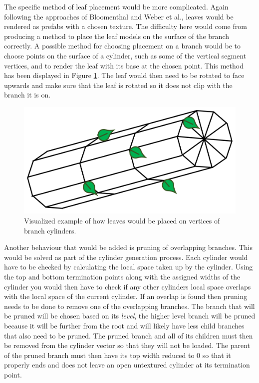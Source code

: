 \documentclass[final]{cmpreport}
\begin{document}
The specific method of leaf placement would be more complicated. Again following the approaches of 
Bloomenthal and Weber et al., leaves would be rendered as prefabs with a chosen texture. The difficulty 
here would come from producing a method to place the leaf models on the surface of the branch correctly.
A possible method for choosing placement on a branch would be to choose points on the surface of a 
cylinder, such as some of the vertical segment vertices, and to render the leaf with its base at the 
chosen point. This method has been displayed in Figure \ref{fig:leaf-placement}. The leaf would then 
need to be rotated to face upwards and make sure that the leaf is rotated so it does not clip with the 
branch it is on.

\begin{figure}[ht]
    \includegraphics[scale=0.4]{leaf-placement.PNG} 
    \centering
    \captionsetup{justification=centering}
    \caption{Visualized example of how leaves would be placed on vertices of branch cylinders.}
    \label{fig:leaf-placement}
\end{figure}

Another behaviour that would be added is pruning of overlapping branches. This would be solved 
as part of the cylinder generation process. Each cylinder would have to be checked by calculating 
the local space taken up by the cylinder. Using the top and bottom termination points along with the 
assigned widths of the cylinder you would then have to check if any other cylinders local space 
overlaps with the local space of the current cylinder. If an overlap is found then pruning needs to 
be done to remove one of the overlapping branches. The branch that will be pruned will be chosen 
based on its \emph{level}, the higher level branch will be pruned because it will be further from 
the root and will likely have less child branches that also need to be pruned. The pruned branch 
and all of its children must then be removed from the cylinder vector so that they will not be 
loaded. The parent of the pruned branch must then have its top width reduced to 0 so that it 
properly ends and does not leave an open untextured cylinder at its termination point.
\end{document}
